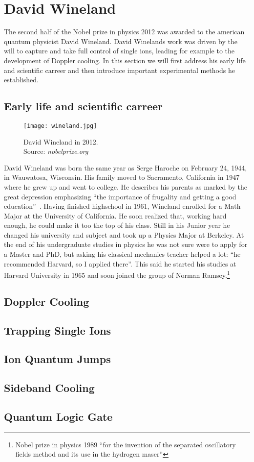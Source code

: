 \section{David Wineland}
The second half of the Nobel prize in physics 2012 was awarded to the american
quantum physicist David Wineland. David Winelands work was driven by the will to
capture and take full control of single ions, leading for example to the
development of Doppler cooling. In this section we will first address
his early life and scientific carreer and then introduce important experimental
methods he established.

\subsection{Early life and scientific carreer}
\begin{wrapfigure}{r}{0.34\textwidth}
  \centering
  \texttt{[image: wineland.jpg]}
  \caption{David Wineland in 2012.\\ Source: \textit{nobelprize.org}}
\end{wrapfigure}
David Wineland was born the same year as Serge Haroche on February 24, 1944,
in Wauwatosa, Wisconsin. His family moved to Sacramento, California in 1947
where he grew up and went to college. He describes his parents as marked by the
great depression emphasizing ``the importance of frugality and getting a good
education''~\cite{dwbio}. Having finished highschool in 1961, Wineland enrolled
for a Math Major at the University of California. He soon realized that, working
hard enough, he could make it too the top of his class. Still in his Junior year
he changed his university and subject and took up a Physics Major at Berkeley.
At the end of his undergraduate studies in physics he was not sure were to apply
for a Master and PhD, but asking his classical mechanics teacher helped a lot:
``he recommended Harvard, so I applied there''. This said he started his studies
at Harvard University in 1965 and soon joined the group of Norman Ramsey.\footnote{Nobel
prize in physics 1989 ``for the invention of the separated oscillatory fields
method and its use in the hydrogen maser''}

\subsection{Doppler Cooling}

\subsection{Trapping Single Ions}

\subsection{Ion Quantum Jumps}

\subsection{Sideband Cooling}

\subsection{Quantum Logic Gate}
